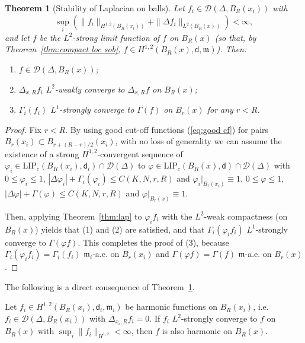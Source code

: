 \documentclass[a4paper,11pt,reqno]{article}
\numberwithin{equation}{section}
\theoremstyle{plain}
\newtheorem{theorem}{Theorem}[section]
\theoremstyle{definition}
\theoremstyle{remark}
\let\altphi\phi
\let\phi\varphi
\let\varphi\altphi
\let\altphi\undefined
\newcommand{\dist}{\mathsf{d}}
\newcommand{\meas}{\mathfrak{m}}
\begin{document}
{\begin{theorem}[Stability of Laplacian on balls]\label{thm:stability lap}
Let $f_i \in \mathcal{D}(\Delta, B_R(x_i))$ with 
$$
\sup_i(\|f_i\|_{H^{1, 2}(B_R(x_i))}+\|\Delta f_i\|_{L^2(B_R(x))})<\infty,
$$
and let $f$ be the $L^2$-strong limit function of $f$ on $B_R(x)$ (so that, by Theorem~\ref{thm:compact loc sob}, 
$f \in H^{1, 2}(B_R(x), \dist, \meas)$). Then: 
\begin{enumerate}
\item[(1)] $f \in \mathcal{D}(\Delta, B_R(x))$;
\item[(2)] $\Delta_{x,R} f_i$ $L^2$-weakly converge to $\Delta_{x,R} f$ on $B_R(x)$; 
\item[(3)] $\Gamma_i (f_i)$ $L^1$-strongly converge to $\Gamma(f)$ on $B_r(x)$ 
for any $r<R$. %
\end{enumerate}
\end{theorem}
\begin{proof}
Fix $r<R$.
By using good cut-off functions (\ref{eq:good cf}) for pairs $B_r(x_i) \subset B_{r+(R-r)/2}(x_i)$, with no loss of generality we can assume 
the existence of a strong $H^{1, 2}$-convergent sequence of $\phi_i \in \mathrm{LIP}_c(B_R(x_i), \dist_i) \cap \mathcal{D}(\Delta)$ to $\phi \in \mathrm{LIP}_c(B_R(x), \dist) \cap \mathcal{D}(\Delta)$ with $0 \le \phi_i \le 1$, $|\Delta \phi_i| +\Gamma_i(\phi_i) \le C(K, N, r, R)$ and $\phi_i\vert_{B_r(x_i)}\equiv 1$, $0 \le \phi\le 1$, $|\Delta \phi| +\Gamma(\phi) \le C(K, N, r, R)$ and $\phi\vert_{B_r(x)}\equiv 1$.

Then, applying Theorem~\ref{thm:lap} to $\phi_if_i$ with the $L^2$-weak compactness (on $B_R(x)$) yields that (1) and (2) are satisfied, 
and that $\Gamma_i(\phi_if_i)$ $L^1$-strongly converge to $\Gamma(\phi f)$. This completes the proof of (3), 
because $\Gamma_i(\phi_if_i)=\Gamma_i(f_i)$ $\meas_i$-a.e. on $B_r(x_i)$ and $\Gamma (\phi f)=\Gamma(f)$ 
$\meas$-a.e. on $B_r(x)$. 
\end{proof}

The following is a direct consequence of Theorem~\ref{thm:stability lap}.

\begin{corollary}\label{cor:stab harm}
Let $f_i\in H^{1,2}(B_R(x_i),\dist_i,\meas_i)$ be harmonic functions on $B_R(x_i)$, i.e. $f_i \in \mathcal{D}(\Delta, B_R(x_i))$ 
with $\Delta_{x_i,R} f_i =0$. If $f_i$ $L^2$-strongly converge to $f$ on $B_R(x)$ with $\sup_i\|f_i\|_{H^{1, 2}}<\infty$, 
then $f$ is also harmonic on $B_R(x)$.
\end{corollary}


}
\end{document}
